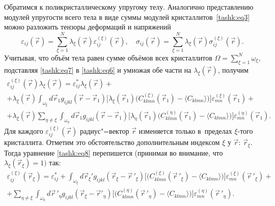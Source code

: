 Обратимся к поликристаллическому упругому телу. Аналогично представлению
модулей упругости всего тела в виде суммы модулей кристаллитов~\eqref{tashk:eq3} можно
разложить тензоры деформаций и напряжений
\begin{equation}
\label{tashk:eq7}
\varepsilon _{ij}(\vec {r})=\sum\limits_{\xi =1}^N \lambda _\xi (\vec
{r})\varepsilon _{ij}^{(\xi )} (\vec {r}),
\quad
\sigma _{ij} (\vec {r})=\sum\limits_{\xi =1}^N \lambda _\xi (\vec
{r})\sigma _{ij}^{(\xi )} (\vec {r}).
\end{equation}
Учитывая, что объём тела равен сумме объёмов всех кристаллитов $\Omega
=\sum_{\xi =1}^N \omega_\xi$, подставляя \eqref{tashk:eq7} в \eqref{tashk:eq6} и умножая обе
части на $\lambda_\xi(\vec {r})$, получим
\begin{multline}
\label{tashk:eq8}
\varepsilon _{ij}^{(\xi )} (\vec {r})\lambda _\xi (\vec {r})=\varepsilon
_{ij}^\ast \lambda_\xi (\vec {r})+ \\ 
+\lambda_\xi(\vec
{r}) \int _{\omega_\xi} d\vec {r}_1 g_{ijkl} (\vec {r}-\vec {r}_1
) \bigl[ \lambda_\xi(\vec {r}_1 )\bigl( C_{klmn}^{(\xi )} (\vec {r}_1)-\langle C_{klmn} \rangle \bigr)\bigr] \varepsilon_{mn}^{(\xi)}(\vec {r}_1 )+ \\
+\lambda _\xi (\vec {r})\sum\limits_{\eta \ne \xi }  \int _{\omega _\eta} 
d\vec{r}_1 g_{ijkl} (\vec {r}-\vec {r}_1 )
\bigl[ \lambda _\eta(\vec {r}_1 )\bigl( C_{klmn}^{(\eta )} (\vec {r}_1 )-\langle C_{klmn} \rangle \bigr)\bigr] \varepsilon _{mn}^{(\eta )} (\vec {r}_1 ).
\end{multline}
Для каждого $\varepsilon _{ij}^{(\xi )} (\vec {r})$ радиус"=вектор $\vec {r}$ изменяется только в~пределах $\xi$-того кристаллита. 
Отметим это обстоятельство дополнительным индексом $\xi$ у $\vec {r}$: $\vec {r}_\xi$. 
Тогда уравнение \eqref{tashk:eq8} перепишется (принимая во внимание, что $\lambda_\xi(\vec {r}_\xi )=1)$
так:
\begin{multline}
\label{tashk:eq9}
\varepsilon _{ij}^{(\xi )} (\vec {r}_\xi)=\varepsilon _{ij}^\ast + \int _{\omega _\xi} d\vec{r}_\xi' g_{ijkl} (\vec {r}_\xi-\vec {r}\,'_\xi)
\bigl[\bigl( C_{klmn}^{(\xi )} \left(\vec {r}\,'_\xi \right)-\langle C_{klmn} \rangle\bigr)\bigr] \varepsilon _{mn}^{(\xi )} \left(\vec {r}\,'_\xi\right)+ \\
+\sum\limits_{\eta \ne \xi }  \int _{\omega_\eta} d \vec {r}\,'_\eta g_{ijkl} \left(\vec
{r}_\xi- \vec {r}'_\eta \right)
\bigl[\bigl( C_{klmn}^{(\eta )} \left(\vec {r}\,'_\eta \right)-\langle C_{klmn} \rangle  \bigr) \bigr]\varepsilon _{mn}^{(\eta )} \left(\vec {r}\,'_\eta \right).
\end{multline}

